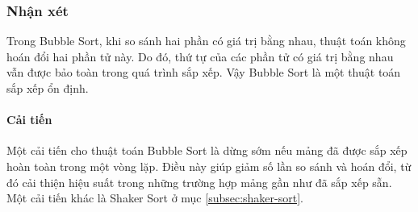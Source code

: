\subsubsection{Nhận xét}

Trong Bubble Sort, khi so sánh hai phần có giá trị bằng nhau, thuật toán không hoán đổi hai phần tử này. Do đó, thứ tự của các phần tử có giá trị bằng nhau vẫn được bảo toàn trong quá trình sắp xếp. Vậy Bubble Sort là một thuật toán sắp xếp ổn định.

\paragraph{Cải tiến}
Một cải tiến cho thuật toán Bubble Sort là dừng sớm nếu mảng đã được sắp xếp hoàn toàn trong một vòng lặp. Điều này giúp giảm số lần so sánh và hoán đổi, từ đó cải thiện hiệu suất trong những trường hợp mảng gần như đã sắp xếp sẵn.
Một cải tiến khác là Shaker Sort ở mục \ref{subsec:shaker-sort}.